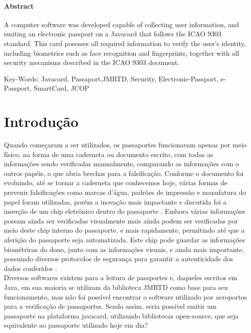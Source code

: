 \documentclass{article}
\begin{document}
	\paragraph{\large Abstract}
		\begin{justify}

			\hspace{2cm} A computer software was developed capable of collecting user information, and emiting an electronic passport on a Javacard that follows the ICAO 9303 standard. This card posesses all required information to verify the user's identity, including biometrics such as face recognition and fingerprints, together with all security mecanisms described in the ICAO 9303 document.

	\vspace*{10px}
Key-Words: Javacard, Passaport,JMRTD, Security, Electronic-Passport, e-Passport, SmartCard, JCOP

		\end{justify}
	
	\newpage

	\tableofcontents
	\listoffigures
	\newpage

	\pagenumbering{arabic}

	\section{Introdução}
		\begin{justify}
			
			\hspace{2cm} Quando começaram a ser utilizados, os passaportes funcionavam apenas por meio físico, na forma de uma caderneta ou documento escrito, com todas as informações sendo verificadas manualmente, comparando as informações com o outros papéis, o que abria brechas para a falsificação. Conforme o documento foi evoluindo, até se tornar a caderneta que conhecemos hoje, várias formas de prevenir falsificações como marcas d’água, padrões de impressão e manufatura do papel foram utilizadas, porém a inovação mais impactante e discutida foi a inserção de um chip eletrônico dentro do passaporte \parencite{PASSPORTWIKI}. Embora várias informações possam ainda ser verificadas visualmente mais ainda podem ser verificadas por meio deste chip interno do passaporte, e mais rapidamente, permitindo até que a aferição do passaporte seja automatizada. Este chip pode guardar as informações biométricas do dono, junto com as informações visuais, e ainda mais importante, possuindo diversos protocolos de segurança para garantir a autenticidade dos dados conferidos \parencite{HOWPASSPORT}.\\
			\hspace*{2cm} Diversos softwares existem para a leitura de passportes e, daqueles escritos em Java, em sua maioria se utilizam da biblioteca JMRTD\parencite{JMRTD} como base para seu funcionamento, mas não foi possível encontrar o software utilizado por aeroportos para a verificação de passaportes. Sendo assim, seria possível emitir um passaporte na plataforma javacard, utilizando bibliotecas open-source, que seja equivalente ao passaporte utilizado hoje em dia?

			
		\end{justify}
\end{document}
